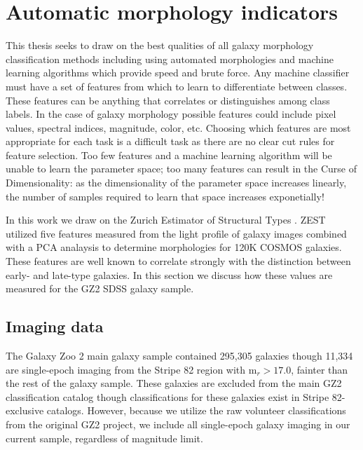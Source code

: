 
\section{Automatic morphology indicators}
This thesis seeks to draw on the best qualities of all galaxy morphology classification methods including using automated morphologies and machine learning algorithms which provide speed and brute force. Any machine classifier must have a set of features from which to learn to differentiate between classes. These features can be anything that correlates or distinguishes among class labels. In the case of galaxy morphology possible features could include pixel values, spectral indices, magnitude, color, etc. Choosing which features are most appropriate for each task is a difficult task as there are no clear cut rules for feature selection. Too few features and a machine learning algorithm will be unable to learn the parameter space; too many features can result in the Curse of Dimensionality: as the dimensionality of the parameter space increases linearly, the number of samples required to learn that space increases exponetially! 

In this work we draw on the Zurich Estimator of Structural Types \citep[ZEST,][]{Scarlata2007}. ZEST utilized five features measured from the light profile of galaxy images combined with a PCA analaysis to determine morphologies for 120K COSMOS galaxies. These features are well known to correlate strongly with the distinction between early- and late-type galaxies. In this section we discuss how these values are measured for the GZ2 SDSS galaxy sample. 

\subsection{Imaging data}
The Galaxy Zoo 2 main galaxy sample contained 295,305 galaxies though 11,334 are single-epoch imaging from the Stripe 82 region with m$_r > 17.0$, fainter than the rest of the galaxy sample. These galaxies are excluded from the main GZ2 classification catalog though classifications for these galaxies exist in Stripe 82-exclusive catalogs. However, because we utilize the raw volunteer classifications from the original GZ2 project, we include all single-epoch galaxy imaging in our current sample, regardless of magnitude limit.  

